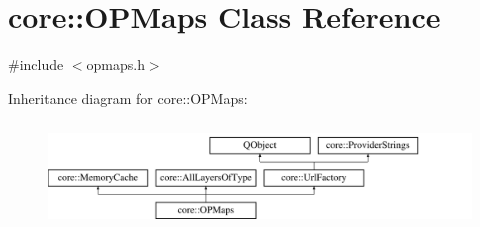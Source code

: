 \hypertarget{classcore_1_1_o_p_maps}{\section{core\-:\-:O\-P\-Maps Class Reference}
\label{classcore_1_1_o_p_maps}
}


{\ttfamily \#include $<$opmaps.\-h$>$}

Inheritance diagram for core\-:\-:O\-P\-Maps\-:\begin{figure}[H]
\begin{center}
\leavevmode
\includegraphics[height=2.837838cm]{classcore_1_1_o_p_maps}
\end{center}
\end{figure}
